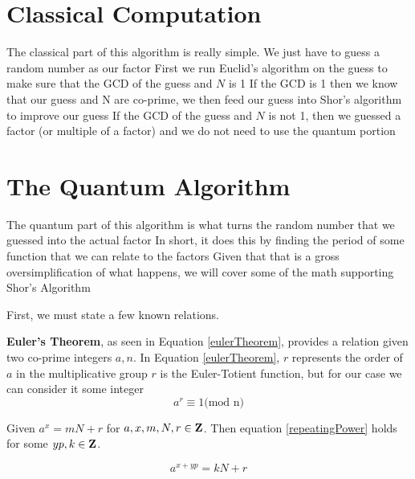 \documentclass[a4paper]{article}
\begin{document}
\section{Classical Computation}

\label{classicalSec}

The classical part of this algorithm is really simple. We just have to guess a random number as our factor
 First we run Euclid's algorithm on the guess to make sure that the GCD of the guess and $N$ is 1
 If the GCD is 1 then we know that our guess and N are co-prime, we then feed our guess into Shor's algorithm to improve our guess
 If the GCD of the guess and $N$ is not 1, then we guessed a factor (or multiple of a factor) and we do not need to use the quantum portion


\section{The Quantum Algorithm}

\label{quantumSec}



The quantum part of this algorithm is what turns the random number that we guessed into the actual factor
 In short, it does this by finding the period of some function that we can relate to the factors
 Given that that is a gross oversimplification of what happens, we will cover some of the math supporting Shor's Algorithm


First, we must state a few known relations. 



\textbf{Euler's Theorem}, as seen in Equation \ref{eulerTheorem}, provides a relation given two co-prime integers
 $a, n$. In Equation \ref{eulerTheorem}, $r$ represents the order of $a$ in the multiplicative group
 $r$ is the Euler-Totient function, but for our case we can consider it some integer
\begin{equation}

a ^ r \equiv 1 \textrm{(mod n)}

\label{eulerTheorem}

\end{equation}





Given $a^x = mN + r$ for $a,x,m,N,r \in \mathbf{Z}$. Then equation \ref{repeatingPower} holds for some $y
 p, k \in \mathbf{Z}$.

\begin{equation}

a^{x + yp} = kN + r

\label{repeatingPower}

\end{equation}
\end{document}

